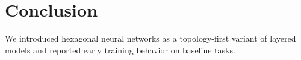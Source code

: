 \section{Conclusion}

We introduced hexagonal neural networks as a topology-first variant of layered models and reported early training behavior on baseline tasks.
